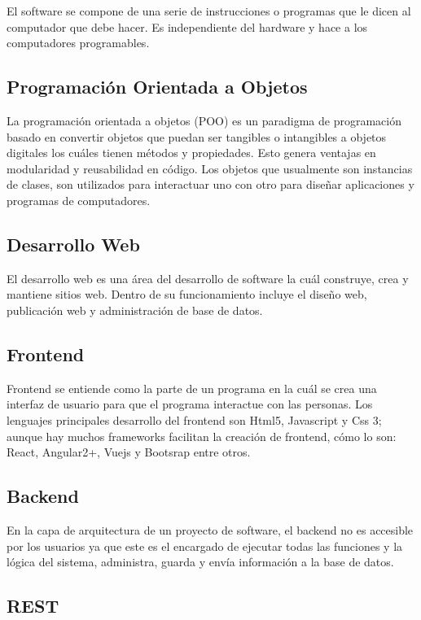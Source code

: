 El software se compone de una serie de instrucciones o programas que le dicen al computador que debe hacer. Es independiente del hardware y hace a los computadores programables.  \cite{A31}

\subsection{Programación Orientada a Objetos}

La programación orientada a objetos (POO) es un paradigma de programación  basado en convertir objetos que puedan ser tangibles o intangibles a objetos digitales los cuáles tienen métodos y propiedades. Esto genera ventajas en modularidad y reusabilidad en código. Los objetos que usualmente son instancias de clases, son utilizados para interactuar uno con otro para diseñar aplicaciones y programas de computadores. \cite{A32}

\subsection{Desarrollo Web}

El desarrollo web es una área del desarrollo de software la cuál construye, crea y mantiene sitios web. Dentro de su funcionamiento incluye el diseño web, publicación web y administración de base de datos. \cite{A33}

\subsection{Frontend}

Frontend se entiende como la parte de un programa en la cuál se crea una interfaz de usuario para que el programa interactue con las personas. Los lenguajes principales desarrollo del frontend son Html5, Javascript y Css 3; aunque hay muchos frameworks facilitan la creación de frontend, cómo lo son: React, Angular2+, Vuejs y Bootsrap entre otros.

\subsection{Backend}

En la capa de arquitectura de un proyecto de software, el backend no es accesible por los usuarios ya que este es el encargado de ejecutar todas las funciones y la lógica del sistema, administra, guarda y envía información a la base de datos.

\subsection{REST}

